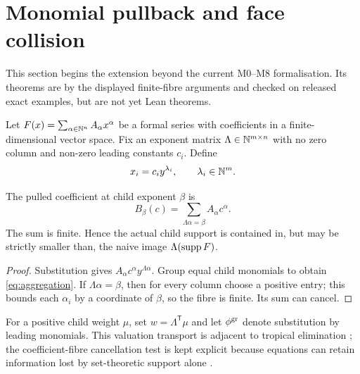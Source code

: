 \section{Monomial pullback and face collision}\label{sec:pb1}

This section begins the extension beyond the current M0--M8 formalisation.
Its theorems are  by the displayed finite-fibre arguments and
checked on released exact examples, but are not yet Lean theorems.

Let \(F(x)=\sum_{\alpha\in\mathbb N^n}A_\alpha x^\alpha\) be a formal series with
coefficients in a finite-dimensional vector space.  Fix an exponent matrix
\(\Lambda\in\mathbb N^{m\times n}\) with no zero column and non-zero leading constants
\(c_i\).  Define
\[
x_i=c_i y^{\lambda_i},\qquad
\lambda_i\in\mathbb N^m.
\]

\begin{theorem}\label{thm:aggregation}
The pulled coefficient at child exponent \(\beta\) is
\begin{equation}\label{eq:aggregation}
B_\beta(c)=\sum_{\Lambda\alpha=\beta}A_\alpha c^\alpha.
\end{equation}
The sum is finite.  Hence the actual child support is contained in, but may be
strictly smaller than, the naive image \(\Lambda(\operatorname{supp} F)\).
\end{theorem}
\begin{proof}
Substitution gives
\(A_\alpha c^\alpha y^{\Lambda\alpha}\).  Group equal child monomials to obtain
\cref{eq:aggregation}.  If \(\Lambda\alpha=\beta\), then for every column choose
a positive entry; this bounds each \(\alpha_i\) by a coordinate of \(\beta\),
so the fibre is finite.  Its sum can cancel.
\end{proof}

For a positive child weight \(\mu\), set \(w=\Lambda^{\mathsf T}\mu\) and let
\(\phi^{\rm gr}\) denote substitution by leading monomials.
This valuation transport is adjacent to tropical elimination
\parencite{SturmfelsTevelev2008}; the coefficient-fibre cancellation test is
kept explicit because equations can retain information lost by set-theoretic
support alone \parencite{Giansiracusa2016}.

